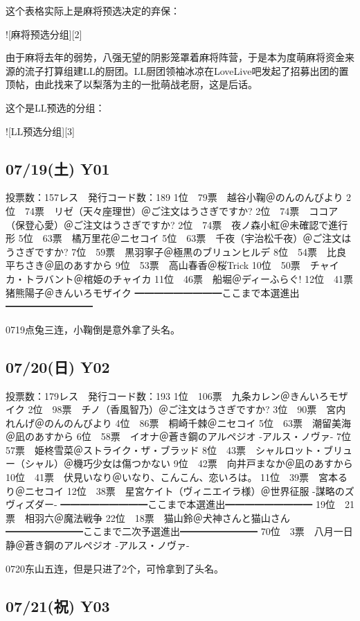 这个表格实际上是麻将预选决定的弃保：

![麻将预选分组][2]

由于麻将去年的弱势，八强无望的阴影笼罩着麻将阵营，于是本为度萌麻将资金来源的流子打算组建LL的厨团。LL厨团领袖冰凉在LoveLive吧发起了招募出团的置顶帖，由此找来了以梨落为主的一批萌战老厨，这是后话。

这个是LL预选的分组：

![LL预选分组][3]

\subsection{07/19(土) Y01}

	投票数：157レス　発行コード数：189
	1位　79票　越谷小鞠＠のんのんびより
	2位　74票　リゼ（天々座理世）＠ご注文はうさぎですか?
	2位　74票　ココア（保登心愛）＠ご注文はうさぎですか?
	2位　74票　夜ノ森小紅＠未確認で進行形
	5位　63票　橘万里花＠ニセコイ
	5位　63票　千夜（宇治松千夜）＠ご注文はうさぎですか?
	7位　59票　黒羽寧子＠極黒のブリュンヒルデ
	8位　54票　比良平ちさき＠凪のあすから
	9位　53票　高山春香＠桜Trick
	10位　50票　チャイカ・トラバント＠棺姫のチャイカ
	11位　46票　船堀＠ディーふらぐ!
	12位　41票　猪熊陽子＠きんいろモザイク
	━━━━━━━━━ここまで本選進出━━━━━━━━━

0719点兔三连，小鞠倒是意外拿了头名。

\subsection{07/20(日) Y02}

	投票数：179レス　発行コード数：193
	1位　106票　九条カレン＠きんいろモザイク
	2位　98票　チノ（香風智乃）＠ご注文はうさぎですか?
	3位　90票　宮内れんげ＠のんのんびより
	4位　86票　桐崎千棘＠ニセコイ
	5位　63票　潮留美海＠凪のあすから
	6位　58票　イオナ＠蒼き鋼のアルペジオ -アルス・ノヴァ-
	7位　57票　姫柊雪菜＠ストライク・ザ・ブラッド
	8位　43票　シャルロット・ブリュー（シャル）＠機巧少女は傷つかない
	9位　42票　向井戸まなか＠凪のあすから
	10位　41票　伏見いなり＠いなり、こんこん、恋いろは。
	11位　39票　宮本るり＠ニセコイ
	12位　38票　星宮ケイト（ヴィニエイラ様）＠世界征服 -謀略のズヴィズダー-
	━━━━━━━━━ここまで本選進出━━━━━━━━━
	19位　21票　相羽六＠魔法戦争
	22位　18票　猫山鈴＠犬神さんと猫山さん
	━━━━━━━━ここまで二次予選進出━━━━━━━━
	70位　3票　八月一日静＠蒼き鋼のアルペジオ -アルス・ノヴァ-

0720东山五连，但是只进了2个，可怜拿到了头名。

\subsection{07/21(祝) Y03}

